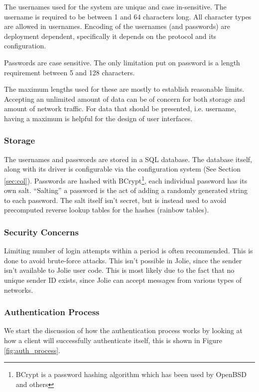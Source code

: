 The usernames used for the system are unique and case in-sensitive. The
username is required to be between 1 and 64 characters long. All character
types are allowed in usernames. Encoding of the usernames (and passwords) are
deployment dependent, specifically it depends on the protocol and its
configuration.

Passwords are case sensitive. The only limitation put on password is a length
requirement between 5 and 128 characters.

The maximum lengths used for these are mostly to establish reasonable limits.
Accepting an unlimited amount of data can be of concern for both storage and
amount of network traffic. For data that should be presented, i.e. username,
having a maximum is helpful for the design of user interfaces.

\subsubsection*{Storage}

The usernames and passwords are stored in a SQL database. The database itself,
along with its driver is configurable via the configuration system (See
Section \ref{sec:col}). Passwords are hashed with
BCrypt\footnote{BCrypt is a password hashing algorithm which has been used
by OpenBSD and others}\cite{provos1999future}, each individual password has
its own salt. ``Salting'' a password is the act of adding a randomly
generated string to each password. The salt itself isn't secret,
but is instead used to avoid precomputed reverse lookup tables for
the hashes (rainbow tables).

\subsubsection*{Security Concerns}

Limiting number of login attempts within a period is often recommended. This is
done to avoid brute-force attacks. This isn't possible in Jolie, since the
sender isn't available to Jolie user code. This is most likely due to the fact
that no unique sender ID exists, since Jolie can accept messages from various
types of networks.

\subsubsection*{Authentication Process}

We start the discussion of how the authentication process works by looking at
how a client will successfully authenticate itself, this is shown in Figure
\ref{fig:auth_process}.

